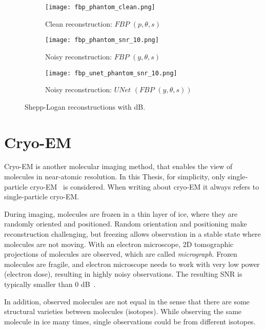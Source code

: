 \begin{figure}[H]
    \captionsetup[subfigure]{justification=centering}
    \centering
    \begin{subfigure}[t]{0.3\textwidth}
        \texttt{[image: fbp\_phantom\_clean.png]}
        \caption{Clean reconstruction: $\textit{FBP }(p, \theta, s)$}
        \label{fig:fbp_phantom}
    \end{subfigure}\hfill
    \begin{subfigure}[t]{0.3\textwidth}
      \texttt{[image: fbp\_phantom\_snr\_10.png]}
      \caption{Noisy reconstruction: $\textit{FBP }(y, \theta, s)$}
      \label{fig:fbp_phantom_noisy}
    \end{subfigure}\hfill
    \begin{subfigure}[t]{0.3\textwidth}
      \texttt{[image: fbp\_unet\_phantom\_snr\_10.png]}
      \caption{Noisy reconstruction: $\textit{UNet }(\textit{FBP }(y, \theta, s))$}
      \label{fig:fbp_unet_phantom_noisy}
    \end{subfigure}
    \caption{Shepp-Logan reconstructions with  dB.}
    \label{fig:phantom_fbps}
  \end{figure}


\section{Cryo-EM}
Cryo-EM is another molecular imaging method, that enables the view of molecules in near-atomic resolution.
In this Thesis, for simplicity, only single-particle cryo-EM~\cite{singleParticleCryoEm} is considered.
When writing about cryo-EM it always refers to single-particle cryo-EM.

During imaging, molecules are frozen in a thin layer of ice, where they are randomly oriented and positioned. 
Random orientation and positioning make reconstruction challenging, 
but freezing allows observation in a stable state where molecules are not moving.
With an electron microscope, 2D tomographic projections of molecules are observed,
which are called \textit{micrograph}. 
Frozen molecules are fragile, and electron microscope needs to work with
very low power (electron dose), resulting in highly noisy observations. The resulting SNR
is typically smaller than 0 dB~\cite{cryoEmMath2}.

In addition, observed molecules are not equal in the sense that there are some structural varieties between
molecules (isotopes). While observing the same molecule in ice many times, single observations could be from different isotopes.

